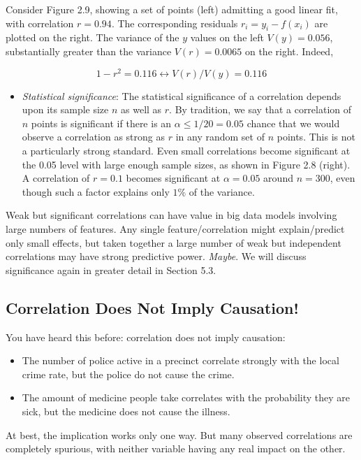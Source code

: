 \documentclass[10pt]{article}
\begin{document}
Consider Figure 2.9, showing a set of points (left) admitting a good linear fit, with correlation $r=0.94$. The corresponding residuals $r_{i}=y_{i}-f\left(x_{i}\right)$ are plotted on the right. The variance of the $y$ values on the left $V(y)= 0.056$, substantially greater than the variance $V(r)=0.0065$ on the right. Indeed,

\[
1-r^{2}=0.116 \longleftrightarrow V(r) / V(y)=0.116
\]

\begin{itemize}
  \item \textit{Statistical significance}: The statistical significance of a correlation depends upon its sample size $n$ as well as $r$. By tradition, we say that a correlation of $n$ points is significant if there is an $\alpha \leq 1/20=0.05$ chance that we would observe a correlation as strong as $r$ in any random set of $n$ points. This is not a particularly strong standard. Even small correlations become significant at the 0.05 level with large enough sample sizes, as shown in Figure 2.8 (right). A correlation of $r=0.1$ becomes significant at $\alpha=0.05$ around $n=300$, even though such a factor explains only $1\%$ of the variance.
\end{itemize}

Weak but significant correlations can have value in big data models involving large numbers of features. Any single feature/correlation might explain/predict only small effects, but taken together a large number of weak but independent correlations may have strong predictive power. \textit{Maybe}. We will discuss significance again in greater detail in Section 5.3.

\subsection{Correlation Does Not Imply Causation!}
You have heard this before: correlation does not imply causation:

\begin{itemize}
  \item The number of police active in a precinct correlate strongly with the local crime rate, but the police do not cause the crime.
  \item The amount of medicine people take correlates with the probability they are sick, but the medicine does not cause the illness.
\end{itemize}

At best, the implication works only one way. But many observed correlations are completely spurious, with neither variable having any real impact on the other.
\end{document}
